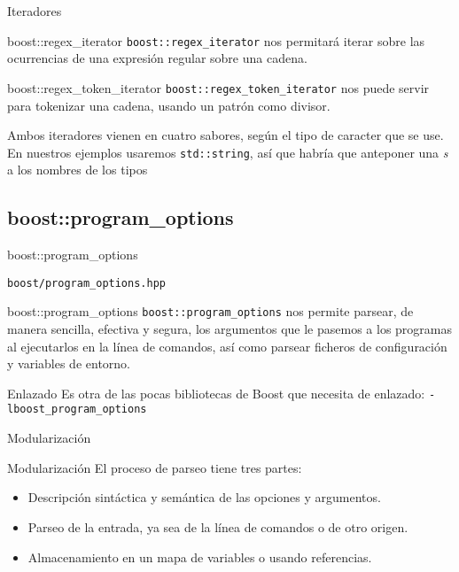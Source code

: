 \documentclass[8pt,xcolor=svgnames]{beamer}
\begin{document}
\begin{frame}{Iteradores}
  \begin{block}{boost::regex\_iterator}
    \texttt{boost::regex\_iterator} nos permitará iterar sobre las
    ocurrencias de una expresión regular sobre una cadena.
  \end{block}
  
  \pause

  \begin{block}{boost::regex\_token\_iterator}
    \texttt{boost::regex\_token\_iterator} nos puede servir para
    tokenizar una cadena, usando un patrón como divisor.
  \end{block}

  \pause
  \begin{block}{}
    Ambos iteradores vienen en cuatro sabores, según el tipo de
    caracter que se use. En nuestros ejemplos usaremos
    \texttt{std::string}, así que habría que anteponer una \textit{s}
    a los nombres de los tipos
  \end{block}
\end{frame}

\subsection{boost::program\_options}

\begin{frame}{boost::program\_options}
  \begin{block}{}
    \texttt{boost/program\_options.hpp}
  \end{block}
  \begin{block}{boost::program\_options}
    \texttt{boost::program\_options} nos permite parsear, de manera
    sencilla, efectiva y segura, los argumentos que le pasemos a los
    programas al ejecutarlos en la línea de comandos, así como parsear
    ficheros de configuración y variables de entorno.
  \end{block}
  \pause
  \begin{alertblock}{Enlazado}
    Es otra de las pocas bibliotecas de Boost que necesita de
    enlazado: \texttt{-lboost\_program\_options}
  \end{alertblock}
\end{frame}

\begin{frame}{Modularización}
  \begin{block}{Modularización}
    El proceso de parseo tiene tres partes:
    \begin{itemize}
    \item Descripción sintáctica y semántica de las opciones y argumentos.
    \item Parseo de la entrada, ya sea de la línea de comandos o de otro origen.
    \item Almacenamiento en un mapa de variables o usando referencias.
    \end{itemize}
  \end{block}  
\end{frame}
\end{document}
